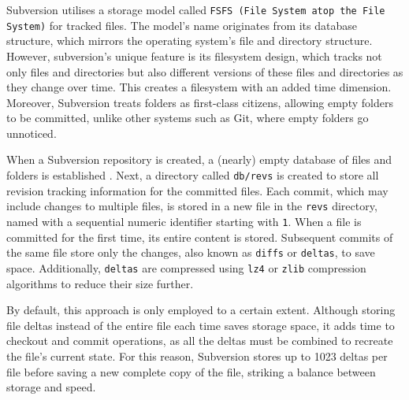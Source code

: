 Subversion utilises a storage model called \lstinline{FSFS (File System atop the File System)} for tracked files. The model's name originates from its database structure, which mirrors the operating system's file and directory structure. However, subversion's unique feature is its filesystem design, which tracks not only files and directories but also different versions of these files and directories as they change over time. This creates a filesystem with an added time dimension. Moreover, Subversion treats folders as first-class citizens, allowing empty folders to be committed, unlike other systems such as Git, where empty folders go unnoticed.
\smallskip

When a Subversion repository is created, a (nearly) empty database of files and folders is established \cite{stopak_2019}. Next, a directory called \lstinline{db/revs} is created to store all revision tracking information for the committed files. Each commit, which may include changes to multiple files, is stored in a new file in the \lstinline{revs} directory, named with a sequential numeric identifier starting with \lstinline{1}. When a file is committed for the first time, its entire content is stored. Subsequent commits of the same file store only the changes, also known as \lstinline{diffs} or \lstinline{deltas}, to save space. Additionally, \lstinline{deltas} are compressed using \lstinline{lz4} or \lstinline{zlib} compression algorithms to reduce their size further.
\smallskip

By default, this approach is only employed to a certain extent. Although storing file deltas instead of the entire file each time saves storage space, it adds time to checkout and commit operations, as all the deltas must be combined to recreate the file's current state. For this reason, Subversion stores up to 1023 deltas per file before saving a new complete copy of the file, striking a balance between storage and speed.


